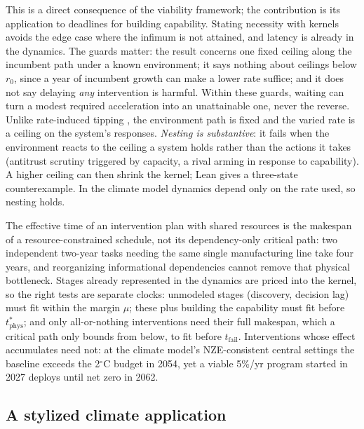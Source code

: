 \documentclass[11pt]{article}
\theoremstyle{plain}
\theoremstyle{definition}
\newcommand{\phys}{\mathrm{phys}}
\newcommand{\fail}{\mathrm{fail}}
\begin{document}
This is a direct consequence of the viability framework; the contribution is its application to deadlines for building capability. Stating necessity with kernels avoids the edge case where the infimum is not attained, and latency is already in the dynamics. The guards matter: the result concerns one fixed ceiling along the incumbent path under a known environment; it says nothing about ceilings below $r_0$, since a year of incumbent growth can make a lower rate suffice; and it does not say delaying \emph{any} intervention is harmful. Within these guards, waiting can turn a modest required acceleration into an unattainable one, never the reverse. Unlike rate-induced tipping \citep{WieczorekEtAl2011,AshwinEtAl2012}, the environment path is fixed and the varied rate is a ceiling on the system's responses. \emph{Nesting is substantive}: it fails when the environment reacts to the ceiling a system holds rather than the actions it takes (antitrust scrutiny triggered by capacity, a rival arming in response to capability). A higher ceiling can then shrink the kernel; Lean gives a three-state counterexample. In the climate model dynamics depend only on the rate used, so nesting holds.

The effective time of an intervention plan with shared resources is the makespan of a resource-constrained schedule, not its dependency-only critical path: two independent two-year tasks needing the same single manufacturing line take four years, and reorganizing informational dependencies cannot remove that physical bottleneck. Stages already represented in the dynamics are priced into the kernel, so the right tests are separate clocks: unmodeled stages (discovery, decision lag) must fit within the margin $\mu$; these plus building the capability must fit before $t^*_\phys$; and only all-or-nothing interventions need their full makespan, which a critical path \citep{KelleyWalker1959} only bounds from below, to fit before $t_\fail$. Interventions whose effect accumulates need not: at the climate model's NZE-consistent central settings the baseline exceeds the 2$^\circ$C budget in 2054, yet a viable 5\%/yr program started in 2027 deploys until net zero in 2062.

\subsection{A stylized climate application}
\end{document}

